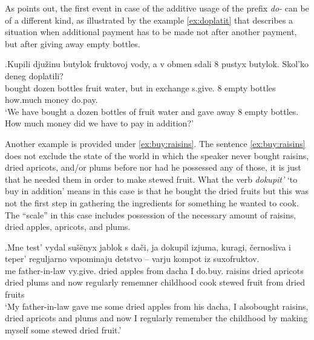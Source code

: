 As \citet[80]{Kagan:book} points out, the first event in case of the additive usage of the prefix \textit{do-} can be of a different kind, as illustrated by the example \ref{ex:doplatit} that describes a situation when additional payment has to be made not after another payment, but after giving away empty bottles.

\exg.\label{ex:doplatit}Kupili dju\v{z}inu butylok fruktovoj vody, a v obmen sdali 8 pustyx butylok. Skol'ko deneg doplatili?\\
bought dozen bottles fruit water, but in exchange s.give. 8 empty bottles how.much money do.pay.\\
\trans `We have bought a dozen bottles of fruit water and gave away 8 empty bottles. How much money did we have to pay in addition?'


Another example is provided under \ref{ex:buy:raisins}. The sentence \ref{ex:buy:raisins} does not exclude the state of the world in which the speaker never bought raisins, dried apricots, and/or plums before nor had he possessed any of those, it is just that he needed them in order to make stewed fruit. What the verb \textit{dokupit'} `to buy in addition' means in this case is that he bought the dried fruits but this was not the first step in gathering the ingredients for something he wanted to cook. The ``scale'' in this case includes possession of the necessary amount of raisins, dried apples, apricots, and plums. 

\exg.\label{ex:buy:raisins}Mne test' vydal su\v{s}\"{e}nyx jablok s da\v{c}i, ja dokupil izjuma, kuragi, \v{c}ernosliva i teper' reguljarno vspominaju detstvo -- varju kompot iz suxofruktov.\\
me father-in-law vy.give. dried apples from dacha I do.buy. raisins {dried apricots} {dried plums} and now regularly rememner childhood {} cook {stewed fruit} from {dried fruits}\\
\trans `My father-in-law gave me some dried apples from his dacha, I also\linebreak bought raisins, dried apricots and plums and now I regularly remember the childhood by making myself some stewed dried fruit.'\\

